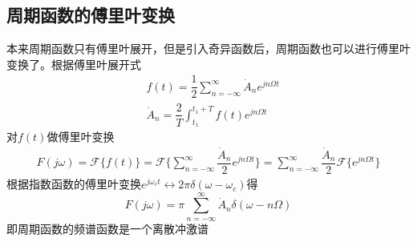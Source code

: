 \subsection{周期函数的傅里叶变换}
本来周期函数只有傅里叶展开，但是引入奇异函数后，周期函数也可以进行傅里叶变换了。根据傅里叶展开式
\begin{align}
    &f(t)=\dfrac{1}{2}\sum_{n=-\infty}^{\infty}\dot{A}_n e^{jn\Omega t}\\
    &\dot{A}_n = \dfrac{2}{T}\int_{t_1}^{t_1 +T}f(t)e^{jn\Omega t}
\end{align}
对$f(t)$做傅里叶变换
\begin{align}
    F(j\omega)=\mathcal{F}\{ f(t) \}=\mathcal{F}\{ \sum_{n=-\infty}^{\infty}\dfrac{\dot{A}_n}{2} e^{jn\Omega t} \}=\sum_{n=-\infty}^{\infty}\dfrac{\dot{A}_n}{2} \mathcal{F}\{ e^{jn\Omega t}\}
\end{align}
根据指数函数的傅里叶变换$e^{j\omega_c t} \leftrightarrow  2\pi \delta(\omega-\omega_c)$得
\begin{equation}
    F(j\omega)=\pi \sum_{n=-\infty}^{\infty} \dot{A}_n \delta(\omega - n \Omega)
\end{equation}
即周期函数的频谱函数是一个离散冲激谱
